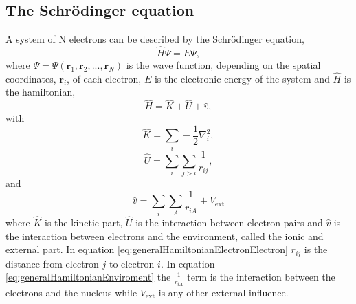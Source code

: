 \subsection{The Schr\"odinger equation}
\label{sec:schrodinger}
A system of N electrons can be described by the Schr\"odinger equation,
\begin{equation}
\label{eq:schrodingerBasic}
 \widehat{H}\Psi = E \Psi,
\end{equation}
where $\Psi = \Psi(\textbf{r}_{1}, \textbf{r}_{2}, ... ,\textbf{r}_{N})$ is the wave function, depending on the spatial coordinates, $\textbf{r}_{i}$, of each electron, $E$ is the electronic energy of the system and $\widehat{H}$ is the hamiltonian,
\begin{equation}
 \widehat{H} = \widehat{K} + \widehat{U} + \widehat{v},
 \label{eq:generalHamiltonian}
\end{equation}
with
\begin{equation}
 \widehat{K} = \displaystyle\sum_{{i}} - \frac{1}{2}\nabla^2_{i}
 \label{eq:generalHamiltonianKinetic},
\end{equation}
\begin{equation}
 \widehat{U} = \displaystyle\sum_{{i}}\sum_{{j}>{i}}\frac{1}{r_{ij}}
 \label{eq:generalHamiltonianElectronElectron},
\end{equation}
and
\begin{equation}
 \widehat{v} = \displaystyle\sum_{i}\sum_{A}\frac{1}{r_{iA}} + V_\mathrm{ext}
 \label{eq:generalHamiltonianEnviroment}
\end{equation}
where $\widehat{K}$ is the kinetic part, $\widehat{U}$ is the interaction between electron pairs and $\widehat{v}$ is the interaction between electrons and the environment, called the ionic and external part. In equation \ref{eq:generalHamiltonianElectronElectron} $r_{ij}$ is the distance from electron $j$ to electron $i$. In equation \ref{eq:generalHamiltonianEnviroment} the $\frac{1}{r_{iA}}$ term is the interaction between the electrons and the nucleus while $V_\mathrm{ext}$ is any other external influence. 

